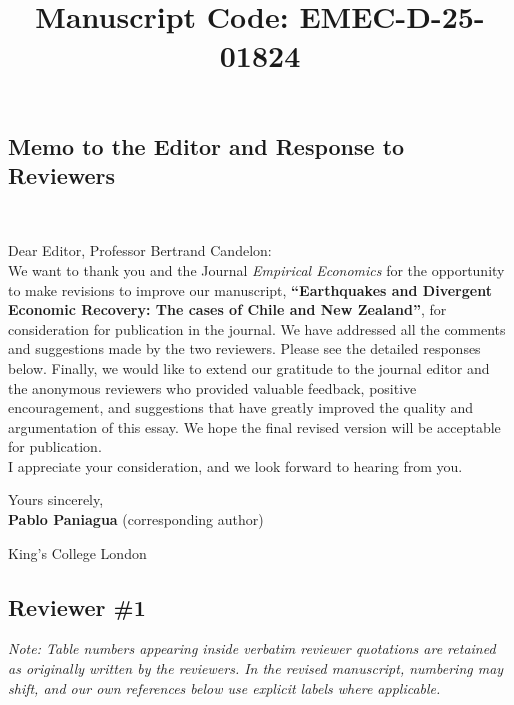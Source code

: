 
\begin{center} 

\section*{Memo to the Editor and Response to Reviewers}

\title{\textbf{Manuscript Code: EMEC-D-25-01824}}\\

\end{center}

\author{}
\date{}
\maketitle

\noindent Dear Editor, Professor Bertrand Candelon:\\

\noindent We want to thank you and the Journal \textit{Empirical Economics} for the opportunity to make revisions to improve our manuscript, \textbf{“Earthquakes and Divergent Economic Recovery: The cases of Chile and New Zealand”}, for consideration for publication in the journal. We have addressed all the comments and suggestions made by the two reviewers. Please see the detailed responses below. Finally, we would like to extend our gratitude to the journal editor and the anonymous reviewers who provided valuable feedback, positive encouragement, and suggestions that have greatly improved the quality and argumentation of this essay. We hope the final revised version will be acceptable for publication.\\ 

\noindent I appreciate your consideration, and we look forward to hearing from you. 

\noindent Yours sincerely,\\


\noindent \textbf{Pablo Paniagua} (corresponding author)


\noindent King's College London


\newpage

\subsection*{Reviewer \#1}

\noindent \textit{Note: Table numbers appearing inside verbatim reviewer quotations are retained as originally written by the reviewers. In the revised manuscript, numbering may shift, and our own references below use explicit labels where applicable.}

